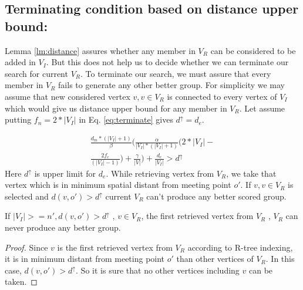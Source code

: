 \documentclass{vldb}
\begin{document}
		
		\subsection{Terminating condition based on distance upper bound:}
		
		
		Lemma \ref{lm:distance} assures whether any member in $ V_R $ can be considered to be added in $ V_I $. But this does not help us to decide whether we can terminate our search for current $ V_R $. To terminate our search, we must assure that every member in $ V_R $ fails to generate any other better group. For simplicity we may assume that  new considered vertex $ v, v \in V_R $ is connected to every vertex of $ V_I $ which would give us distance upper bound for any member in $ V_R $. Let assume putting $ f_n=2*|V_I| $ in Eq. \eqref{eq:terminate} gives $ d^\uparrow=d_e $.
		
		
			\begin{equation}
			\label{eq:terminateDistance}
			\begin{split}
					\frac{d_m*(|V_I|+1)}{\beta}\Bigg(\frac{\alpha}{|V_I|*(|V_I|+1)}\bigg(2*|V_I|-
					\\
					\frac{2f_c}{(|V_I|-1)}
					\bigg)+
					\frac{\gamma}{|V|}\Bigg)+
					\frac{d_c}{|V_I|} >   d^\uparrow
			\end{split}		
			\end{equation}
			Here $ d^\uparrow $ is upper limit for $ d_{e} $.
			While retrieving vertex from $ V_R $, we take that vertex which is in minimum spatial distant from meeting point $ o' $. If $ v, v \in V_R $ is selected and $ d(v,o') > d^\uparrow$ current $ V_R $ can't produce any better scored group.
			
			
		
		\begin{Lemma}
			\label{lm:distanceUpper}
			If $ |V_I|>=n' , d(v,o')>d^\uparrow$ , $ v \in V_R $, the first retrieved vertex from $ V_R $ , $ V_R $ can never produce any better group.
		\end{Lemma}
		
		\begin{proof}
		 Since $ v $ is the first retrieved vertex from 
				$ V_R $ according to R-tree indexing, it is in minimum distant from meeting point $ o' $ than other vertices of $ V_R $. In this case,  $ d(v,o')>d^\uparrow $. So it is sure that no other vertices including $ v $ can be taken. 
		\end{proof}
		
		
						
\end{document}
